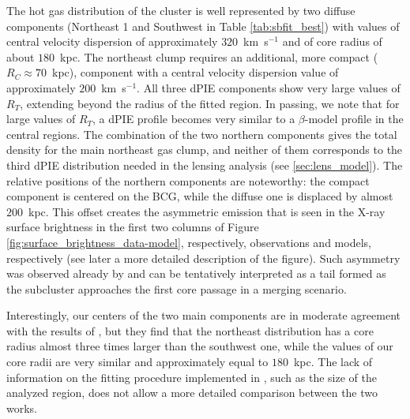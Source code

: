 \documentclass[twocolumn]{aastex61}
\begin{document}
The hot gas distribution of the cluster is well represented by two diffuse components
(Northeast 1 and Southwest in Table \ref{tab:sbfit_best}) with values of central velocity dispersion of
approximately $320$~km~s$^{-1}$ and of core radius of about $180$~kpc.
The northeast clump requires an additional, more compact ($R_C \approx 70$~kpc),
component with a central velocity dispersion value of approximately $200$~km~s$^{-1}$.
All three dPIE components show very large values of $R_T$, extending beyond the
radius of the fitted region.
In passing, we note that for large values of $R_T$, a dPIE profile
becomes very similar to a $\beta$-model profile in the central regions.
The combination of the two northern components gives the total density for the main
northeast gas clump, and neither of them corresponds to the third dPIE
distribution needed in the lensing analysis (see \ref{sec:lens_model}).
The relative positions of the northern components are noteworthy: the compact
component is centered on the BCG, while the diffuse one is displaced by almost
$200$~kpc.
This offset creates the asymmetric emission that is seen in the
X-ray surface brightness in the first two columns of Figure \ref{fig:surface_brightness_data-model},
respectively, observations and models, respectively (see later a more detailed description of the figure).
Such asymmetry was observed already by \citet{Ogrean2015} and can be tentatively
interpreted as a tail formed as the subcluster approaches the first core passage
in a merging scenario.

Interestingly, our centers of the two main components are in moderate agreement with the
results of \citet{Jauzac2015}, but they find that the northeast distribution
has a core radius almost three times larger than the southwest one, while the
values of our core radii are very similar and approximately equal to $180$~kpc.
The lack of information on the fitting procedure implemented in \citet{Jauzac2015},
such as the size of the analyzed region, does not allow a more detailed comparison
between the two works.
\end{document}
